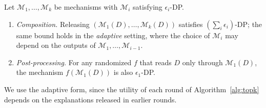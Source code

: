 \begin{theorem}
\label{thm:sequential-composition}\label{thm:post-processing}
Let $\mathcal{M}_1,\ldots,\mathcal{M}_k$ be mechanisms with $\mathcal{M}_i$ satisfying $\epsilon_i$-DP.
\begin{enumerate}[label=(\roman*),leftmargin=*]
\item \emph{Composition.} Releasing $(\mathcal{M}_1(D),\ldots,\mathcal{M}_k(D))$ satisfies $(\sum_{i}\epsilon_i)$-DP; the same bound holds in the \emph{adaptive} setting, where the choice of $\mathcal{M}_i$ may depend on the outputs of $\mathcal{M}_1,\dots,\mathcal{M}_{i-1}$.
\item \emph{Post-processing.} For any randomized $f$ that reads $D$ only through $\mathcal{M}_1(D)$, the mechanism $f(\mathcal{M}_1(D))$ is also $\epsilon_1$-DP.
\end{enumerate}
\end{theorem}


We use the adaptive form, since the utility of each round of Algorithm~\ref{alg:topk} depends on the explanations released in earlier rounds.
